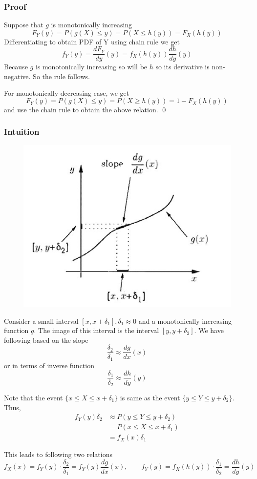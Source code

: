 \subsubsection{Proof}
Suppose that $g$ is monotonically increasing
\[F_Y(y)=P(g(X)\le y)=P(X\le h(y))=F_X(h(y))\]
Differentiating to obtain PDF of Y using chain rule we get
\[f_Y(y)=\frac{dF_Y}{dy}(y)=f_X(h(y))\frac{dh}{dy}(y)\]
Because $g$ is monotonically increasing so will be $h$ so its derivative is non-negative. So the rule follows.

For monotonically decreasing case, we get
\[F_Y(y)=P(g(X)\le y)=P(X \ge h(y))=1-F_X(h(y))\]
and use the chain rule to obtain the above relation.
\qed

\subsubsection{Intuition}

\begin{figure}[h]
    \center
    \includegraphics[width=.5\textwidth]{images/P_4_derived_distribution.jpeg}
 \end{figure}

 Consider a small interval $[x,x+\delta_1], \delta_1 \approx 0$ and a monotonically increasing function $g$. The image of this interval is the interval $[y, y+\delta_2]$. We have following based on the slope
 \[\frac{\delta_2}{\delta_1} \approx \frac{dg}{dx}(x)\]
 or in terms of inverse function
 \[\frac{\delta_1}{\delta_2}\approx \frac{dh}{dy}(y)\]

 Note that the event $\{x \le X \le x+\delta_1\}$ is same as the event $\{y\le Y \le y+\delta_2\}$. Thus,
 \begin{align*}
     f_Y(y)\delta_2 & \approx P(y\le Y \le y+\delta_2) \\
          &= P(x \le X \le x+\delta_1) \\
          &= f_X(x)\delta_1
 \end{align*}

This leads to following two relations
 \[f_X(x)=f_Y(y) \cdot \frac{\delta_2}{\delta_1}=f_Y(y)\frac{dg}{dx}(x), \qquad f_Y(y)=f_X(h(y))\cdot \frac{\delta_1}{\delta_2}=\frac{dh}{dy}(y)\]

